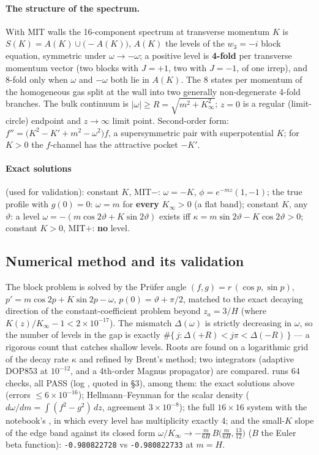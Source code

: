 \paragraph{The structure of the spectrum.} With MIT walls the 16-component spectrum at transverse momentum
$K$ is $S(K)=A(K)\cup\bigl(-A(K)\bigr)$, $A(K)$ the levels of the $w_3=-i$ block equation, symmetric under
$\omega\to-\omega$; a positive level is \textbf{4-fold} per transverse momentum vector (two blocks with
$J=+1$, two with $J=-1$, of one irrep), and 8-fold only when $\omega$ and $-\omega$ both lie in $A(K)$. The
8 states per momentum of the homogeneous gas split at the wall into two generally non-degenerate 4-fold
branches. The bulk continuum is $|\omega|\geq R=\sqrt{m^2+K_\infty^2}$; $z=0$ is a regular (limit-circle)
endpoint and $z\to\infty$ limit point. Second-order form: $f''=\bigl(K^2-K'+m^2-\omega^2\bigr)f$, a
supersymmetric pair with superpotential $K$; for $K>0$ the $f$-channel has the attractive pocket $-K'$.

\paragraph{Exact solutions} (used for validation): constant $K$, MIT$-$: $\omega=-K$, $\phi=e^{-mz}(1,-1)$;
the true profile with $g(0)=0$: $\omega=m$ for \textbf{every} $K_\infty>0$ (a flat band); constant $K$, any
$\vartheta$: a level $\omega=-(m\cos2\vartheta+K\sin2\vartheta)$ exists iff
$\kappa=m\sin2\vartheta-K\cos2\vartheta>0$; constant $K>0$, MIT$+$: \textbf{no} level.

\subsection[{Numerical method and its validation [WG 3, WG 5]}]{Numerical method and its validation }
\label{sec:8.4}

The block problem is solved by the Pr\"ufer angle $(f,g)=r\,(\cos p,\sin p)$,
$p'=m\cos2p+K\sin2p-\omega$, $p(0)=\vartheta+\pi/2$, matched to the exact decaying direction of the
constant-coefficient problem beyond $z_a=3/H$ (where $K(z)/K_\infty-1<2\times10^{-17}$). The mismatch
$\Delta(\omega)$ is strictly decreasing in $\omega$, so the number of levels in the gap is exactly
$\#\{\,j:\Delta(+R)<j\pi<\Delta(-R)\,\}$ --- a rigorous count that catches shallow levels. Roots are found on
a logarithmic grid of the decay rate $\kappa$ and refined by Brent's method; two integrators (adaptive
DOP853 at $10^{-12}$, and a 4th-order Magnus propagator) are compared. 
runs 64 checks, all PASS (log , quoted in 
\S3), among them: the exact solutions above (errors $\leq6\times10^{-16}$); Hellmann--Feynman for the scalar
density ($d\omega/dm=\int(f^2-g^2)\,dz$, agreement $3\times10^{-8}$); the full $16\times16$ system with the
notebook's , in which every level has multiplicity exactly 4; and the small-$K$ slope of the
edge band against its closed form $\omega/K_\infty\to-\frac{m}{6H}\,B\bigl(\frac{m}{6H},\frac{13}{12}\bigr)$ ($B$
the Euler beta function): \texttt{-0.980822728} vs \texttt{-0.980822733} at $m=H$.

